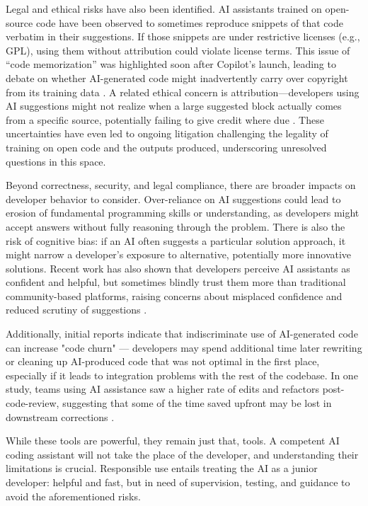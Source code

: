 Legal and ethical risks have also been identified. \gls{AI} assistants trained on open-source code have been observed to sometimes reproduce snippets of that code verbatim in their suggestions. If those snippets are under restrictive licenses (e.g., GPL), using them without attribution could violate license terms. This issue of “code memorization” was highlighted soon after Copilot’s launch, leading to debate on whether \gls{AI}-generated code might inadvertently carry over copyright from its training data \autocite{Sandoval2022}. A related ethical concern is attribution—developers using \gls{AI} suggestions might not realize when a large suggested block actually comes from a specific source, potentially failing to give credit where due \autocite{Xu2024}. These uncertainties have even led to ongoing litigation challenging the legality of training on open code and the outputs produced, underscoring unresolved questions in this space.

Beyond correctness, security, and legal compliance, there are broader impacts on developer behavior to consider. Over-reliance on \gls{AI} suggestions could lead to erosion of fundamental programming skills or understanding, as developers might accept answers without fully reasoning through the problem. There is also the risk of cognitive bias: if an \gls{AI} often suggests a particular solution approach, it might narrow a developer’s exposure to alternative, potentially more innovative solutions. Recent work has also shown that developers perceive AI assistants as confident and helpful, but sometimes blindly trust them more than traditional community-based platforms, raising concerns about misplaced confidence and reduced scrutiny of suggestions \autocite{Li2023QA}.

Additionally, initial reports indicate that indiscriminate use of \gls{AI}-generated code can increase "code churn" — developers may spend additional time later rewriting or cleaning up \gls{AI}-produced code that was not optimal in the first place, especially if it leads to integration problems with the rest of the codebase. In one study, teams using \gls{AI} assistance saw a higher rate of edits and refactors post-code-review, suggesting that some of the time saved upfront may be lost in downstream corrections \autocite{GitClear2024Copilot}.

While these tools are powerful, they remain just that, tools. A competent \gls{AI} coding assistant will not take the place of the developer, and understanding their limitations is crucial. Responsible use entails treating the \gls{AI} as a junior developer: helpful and fast, but in need of supervision, testing, and guidance to avoid the aforementioned risks.

